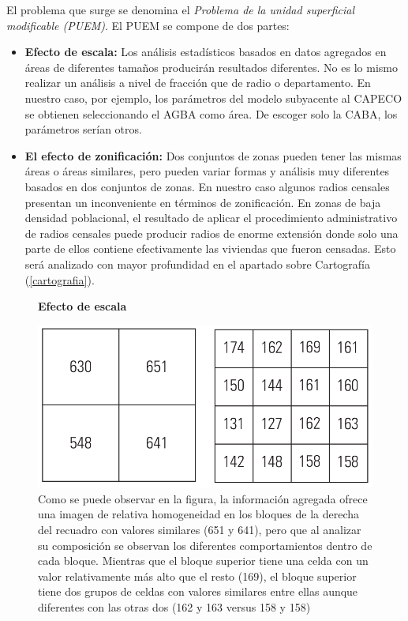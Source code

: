 El problema que surge se denomina el \textit{Problema de la unidad superficial modificable (PUEM)}. El PUEM se compone de dos partes:

\begin{itemize}
	
	\item \textbf{Efecto de escala:} Los análisis estadísticos basados en datos agregados en áreas de diferentes tamaños producirán resultados diferentes. No es lo mismo realizar un análisis a nivel de fracción que de radio o departamento. En nuestro caso, por ejemplo, los parámetros del modelo subyacente al CAPECO se obtienen seleccionando el AGBA como área. De escoger solo la CABA, los parámetros serían otros.
	
	\item  \textbf{El efecto de zonificación:} Dos conjuntos de zonas pueden tener las mismas áreas o áreas similares, pero pueden variar formas y análisis muy diferentes basados en dos conjuntos de zonas. En nuestro caso algunos radios censales presentan un inconveniente en términos de zonificación. En zonas de baja densidad poblacional, el resultado de aplicar el procedimiento administrativo de radios censales puede producir radios de enorme extensión donde solo una parte de ellos contiene efectivamente las viviendas que fueron censadas. Esto será analizado con mayor profundidad en el apartado sobre Cartografía (\ref{cartografia}).  

\end{itemize}

\begin{figure}[ht]
	\centering
	\textbf{Efecto de escala}\par\medskip
	\includegraphics[scale = 0.4]{../img/capitulo2/escala.png}
	\caption{Como se puede observar en la figura, la información agregada ofrece una imagen de relativa homogeneidad en los bloques de la derecha del recuadro con valores similares (651 y 641), pero que al analizar su composición se observan los diferentes comportamientos dentro de cada bloque. Mientras que el bloque superior tiene una celda con un valor relativamente más alto que el resto (169), el bloque superior tiene dos grupos de celdas con valores similares entre ellas aunque diferentes con las otras dos (162 y 163 versus 158 y 158)}
\end{figure}

